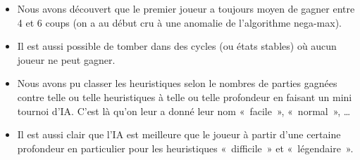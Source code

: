 \begin{itemize}
    \item Nous avons découvert que le premier joueur a toujours moyen de gagner entre 4 et 6 coups
        (on a au début cru à une anomalie de l'algorithme nega-max).
    \item Il est aussi possible de tomber dans des cycles (ou états stables) où aucun joueur ne peut gagner.
    \item Nous avons pu classer les heuristiques selon le nombres de parties gagnées contre telle ou telle heuristiques à
        telle ou telle profondeur en faisant un mini tournoi d'IA\@. C'est là qu'on leur a donné leur nom « facile », « normal », …
    \item Il est aussi clair que l'IA est meilleure que le joueur à partir d'une certaine profondeur en particulier pour les
        heuristiques « difficile » et « légendaire ».
\end{itemize}

